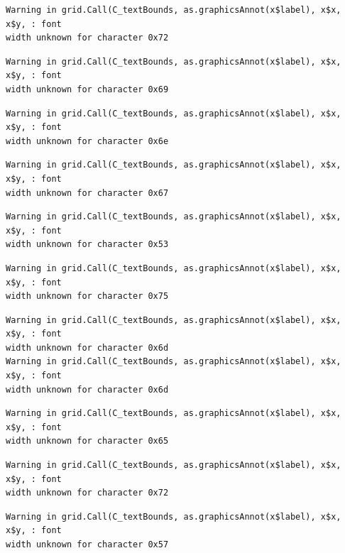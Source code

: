 \documentclass[
  letterpaper,
]{scrbook}
\begin{document}
\begin{verbatim}
Warning in grid.Call(C_textBounds, as.graphicsAnnot(x$label), x$x, x$y, : font
width unknown for character 0x72
\end{verbatim}

\begin{verbatim}
Warning in grid.Call(C_textBounds, as.graphicsAnnot(x$label), x$x, x$y, : font
width unknown for character 0x69
\end{verbatim}

\begin{verbatim}
Warning in grid.Call(C_textBounds, as.graphicsAnnot(x$label), x$x, x$y, : font
width unknown for character 0x6e
\end{verbatim}

\begin{verbatim}
Warning in grid.Call(C_textBounds, as.graphicsAnnot(x$label), x$x, x$y, : font
width unknown for character 0x67
\end{verbatim}

\begin{verbatim}
Warning in grid.Call(C_textBounds, as.graphicsAnnot(x$label), x$x, x$y, : font
width unknown for character 0x53
\end{verbatim}

\begin{verbatim}
Warning in grid.Call(C_textBounds, as.graphicsAnnot(x$label), x$x, x$y, : font
width unknown for character 0x75
\end{verbatim}

\begin{verbatim}
Warning in grid.Call(C_textBounds, as.graphicsAnnot(x$label), x$x, x$y, : font
width unknown for character 0x6d
Warning in grid.Call(C_textBounds, as.graphicsAnnot(x$label), x$x, x$y, : font
width unknown for character 0x6d
\end{verbatim}

\begin{verbatim}
Warning in grid.Call(C_textBounds, as.graphicsAnnot(x$label), x$x, x$y, : font
width unknown for character 0x65
\end{verbatim}

\begin{verbatim}
Warning in grid.Call(C_textBounds, as.graphicsAnnot(x$label), x$x, x$y, : font
width unknown for character 0x72
\end{verbatim}

\begin{verbatim}
Warning in grid.Call(C_textBounds, as.graphicsAnnot(x$label), x$x, x$y, : font
width unknown for character 0x57
\end{verbatim}
\end{document}
